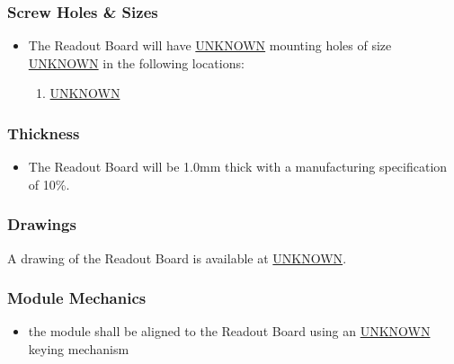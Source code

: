 \documentclass[11pt]{article}
\begin{document}
\subsubsection{Screw Holes \& Sizes}
\label{sec:org85feeca}
\begin{itemize}
\item The Readout Board will have \uline{UNKNOWN} mounting holes of size \uline{UNKNOWN} in the following locations:
\begin{enumerate}
\item \uline{UNKNOWN}
\end{enumerate}
\end{itemize}
\subsubsection{Thickness}
\label{sec:orgdd25d6a}
\begin{itemize}
\item The Readout Board will be 1.0mm thick with a manufacturing specification of \textpm{} 10\%.
\end{itemize}
\subsubsection{Drawings}
\label{sec:orga158ea3}
A drawing of the Readout Board is available at \uline{UNKNOWN}.
\subsubsection{Module Mechanics}
\label{sec:orgee373d6}
\begin{itemize}
\item the module shall be aligned to the Readout Board using an \uline{UNKNOWN} keying mechanism
\end{itemize}
\end{document}
